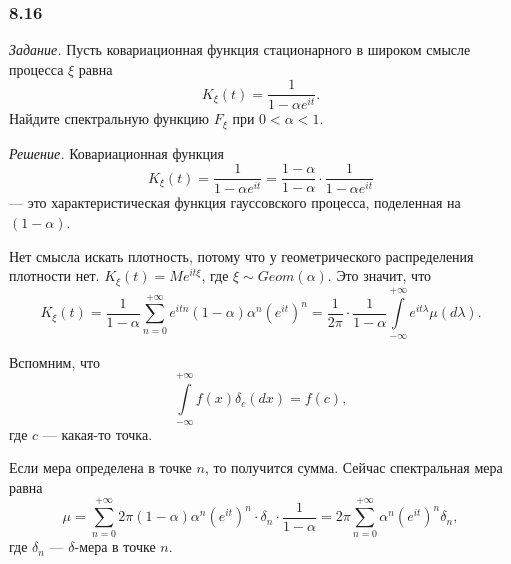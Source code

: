 \subsubsection*{8.16}

\textit{Задание.}
Пусть ковариационная функция стационарного в широком смысле процесса $ \xi $ равна
$$K_{ \xi } \left( t \right) =
  \frac{1}{1 - \alpha e^{it}}.$$
Найдите спектральную функцию $F_{ \xi }$ при $0 < \alpha < 1$.

\textit{Решение.}
Ковариационная функция
$$K_{ \xi } \left( t \right) =
  \frac{1}{1 - \alpha e^{it}} =
  \frac{1 - \alpha }{1 - \alpha } \cdot \frac{1}{1 - \alpha e^{it}}$$
--- это характеристическая функция гауссовского процесса,
поделенная на $ \left( 1 - \alpha \right) $.

Нет смысла искать плотность, потому что у геометрического распределения плотности нет.
$K_{ \xi } \left( t \right) = Me^{it \xi }$, где $ \xi \sim Geom \left( \alpha \right) $.
Это значит, что
$$K_{ \xi } \left( t \right) =
  \frac{1}{1 - \alpha }
  \sum \limits_{n = 0}^{+ \infty }
    e^{itn} \left( 1 - \alpha \right) \alpha^n \left( e^{it} \right)^n =
  \frac{1}{2 \pi } \cdot \frac{1}{1 - \alpha }
  \int \limits_{-\infty }^{+\infty } e^{it \lambda } \mu \left( d \lambda \right).$$

Вспомним, что
$$ \int \limits_{-\infty }^{+\infty } f \left( x \right) \delta_c \left( dx \right) =
  f \left( c \right),$$
где $c$ --- какая-то точка.

Если мера определена в точке $n$, то получится сумма.
Сейчас спектральная мера равна
$$ \mu =
  \sum \limits_{n = 0}^{+\infty }
    2 \pi \left( 1 - \alpha \right) \alpha^n \left( e^{it} \right)^n \cdot \delta_n \cdot
    \frac{1}{1 - \alpha } =
  2 \pi \sum \limits_{n = 0}^{+\infty } \alpha^n \left( e^{it} \right)^n \delta_n,$$
где $ \delta_n$ --- $ \delta $-мера в точке $n$.
